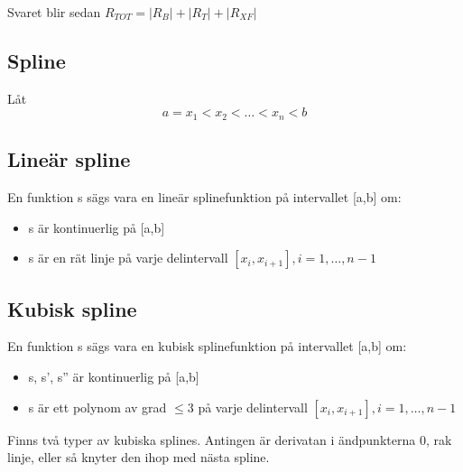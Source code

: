 \documentclass[12pt,a4paper]{article}
\begin{document}
Svaret blir sedan $R_{TOT} = | R_B | + | R_T | + |R_{XF}| $

\subsection{Spline}
Låt 
$$ a = x_1 < x_2 < \ldots < x_n < b $$

\subsection{Lineär spline}
En funktion s sägs vara en lineär splinefunktion på intervallet [a,b] om:
\begin{itemize}
\item{s är kontinuerlig på [a,b]}
\item{s är en rät linje på varje delintervall $[x_i,x_{i+1}], i = 1,\ldots,n-1 $}
\end{itemize}

\subsection{Kubisk spline}
En funktion s sägs vara en kubisk splinefunktion på intervallet [a,b] om:
\begin{itemize}
\item{s, s', s'' är kontinuerlig på [a,b]}
\item{s är ett polynom av grad $\leq 3$ på varje delintervall $[x_i,x_{i+1}], i = 1,\ldots,n-1 $}
\end{itemize}

Finns två typer av kubiska splines.
Antingen är derivatan i ändpunkterna 0, rak linje, eller så knyter den ihop med nästa spline.
\end{document}
